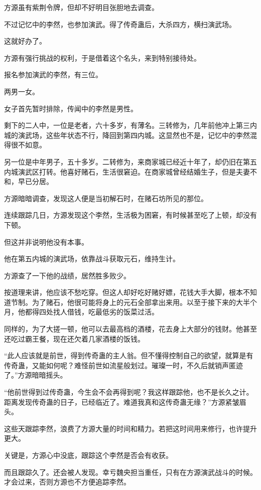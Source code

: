 
\begin{this_body}

方源虽有紫荆令牌，但却不好明目张胆地去调查。

不过记忆中的李然，也参加演武。得了传奇蛊后，大杀四方，横扫演武场。

这就好办了。

方源有强行挑战的权利，于是借着这个名头，来到特别接待处。

报名参加演武的李然，有三位。

两男一女。

女子首先暂时排除，传闻中的李然是男性。

剩下的二人中，一位是老者，六十多岁，有薄名。三转修为，几年前他冲上第三内城的演武场，这些年状态不行，降回到第四内城。这显然也不是，记忆中的李然混得很不如意。

另一位是中年男子，五十多岁。二转修为，来商家城已经近十年了，却仍旧在第五内城演武区打转。他喜好赌石，生活很窘迫。在商家城曾经结婚生子，但是夫妻不和，早已分居。

方源暗暗调查，发现这人便是当初解石时，在赌石坊所见的那位。

连续跟踪几日，方源发现这个李然，生活极为困窘，有时候甚至吃了上顿，却没有下顿。

但这并非说明他没有本事。

他在第五内城的演武场，依靠战斗获取元石，维持生计。

方源查了一下他的战绩，居然胜多败少。

按道理来讲，他应该不愁吃穿。但这人却好吃好赌好嫖，花钱大手大脚，根本不知道节制。为了赌石，他很可能将身上的元石全部拿出来用。以至于接下来的大半个月，他都得四处找人借钱，吃最低劣的饭菜过活。

同样的，为了大搓一顿，他可以去最高档的酒楼，花去身上大部分的钱财。他甚至还吃过霸王餐，现在还欠着几家酒楼的饭钱。

“此人应该就是前世，得到传奇蛊的主人翁。但不懂得控制自己的欲望，就算是有传奇蛊，又能如何呢？难怪前世如流星般划过。璀璨一时，不久后就销声匿迹了。”方源暗暗摇头。

“他前世得到过传奇蛊，今生会不会再得到呢？我这样跟踪他，也不是长久之计。距离发现传奇蛊的日子，已经临近了。难道我真和这传奇蛊无缘？”方源紧皱眉头。

这些天跟踪李然，浪费了方源大量的时间和精力。若把这时间用来修行，也许提升更大。

关键是，方源心中没底，跟踪这个李然是否会有收获。

而且跟踪久了。还会被人发现。幸亏魏央担当重任，只有在方源演武战斗的时候。才会过来，否则方源也不方便追踪李然。


\end{this_body}
